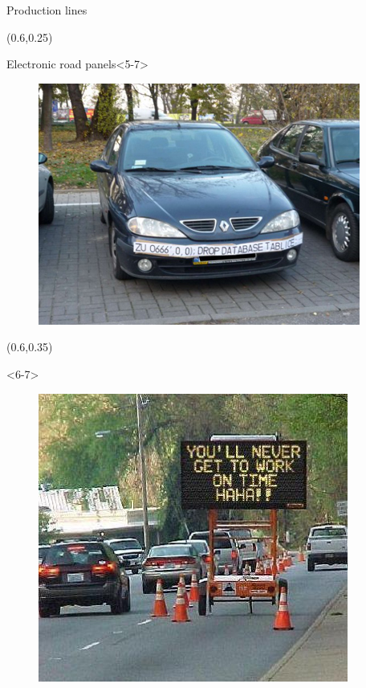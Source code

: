 \documentclass{beamer}
\begin{document}
\begin{frame}
\begin{textblock*}{50mm}
\begin{exampleblock}{Production lines}
\begin{figure}
            \end{figure}
        \end{exampleblock}
    \end{textblock*}
    \begin{textblock*}{50mm}(0.6\textwidth,0.25\textheight)
        \begin{exampleblock}{Electronic road panels}<5-7>
            \begin{figure}
                \includegraphics[width=\textwidth]{imgs/aux/plate_hack_sql.jpg}
            \end{figure}
        \end{exampleblock}
    \end{textblock*}
    \begin{textblock*}{50mm}(0.6\textwidth,0.35\textheight)
        \begin{exampleblock}{}<6-7>
            \begin{figure}
                \includegraphics[width=\textwidth]{imgs/aux/youll_late_hack.jpg}

\end{figure}
\end{exampleblock}
\end{textblock*}
\end{frame}
\end{document}
